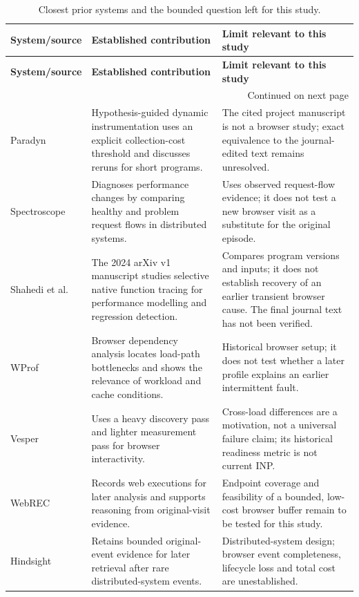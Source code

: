\begin{longtable}{@{}p{}p{}p{}@{}}
\caption{Closest prior systems and the bounded question left for this study.}\label{tab:closest-prior-work}\\
\toprule
\textbf{System/source} & \textbf{Established contribution} & \textbf{Limit relevant to this study} \\
\midrule
\endfirsthead
\toprule
\textbf{System/source} & \textbf{Established contribution} & \textbf{Limit relevant to this study} \\
\midrule
\endhead
\midrule
\multicolumn{3}{r}{\small Continued on next page}\\
\endfoot
\bottomrule
\endlastfoot
Paradyn \parencite{TIIDVPV8} & Hypothesis-guided dynamic instrumentation uses an explicit collection-cost threshold and discusses reruns for short programs. & The cited project manuscript is not a browser study; exact equivalence to the journal-edited text remains unresolved. \\
Spectroscope \parencite{Z2BQ69Z4} & Diagnoses performance changes by comparing healthy and problem request flows in distributed systems. & Uses observed request-flow evidence; it does not test a new browser visit as a substitute for the original episode. \\
Shahedi et al. \parencite{IX2DU87B} & The 2024 arXiv v1 manuscript studies selective native function tracing for performance modelling and regression detection. & Compares program versions and inputs; it does not establish recovery of an earlier transient browser cause. The final journal text has not been verified. \\
WProf \parencite{D568X6SQ} & Browser dependency analysis locates load-path bottlenecks and shows the relevance of workload and cache conditions. & Historical browser setup; it does not test whether a later profile explains an earlier intermittent fault. \\
Vesper \parencite{HS3PKWFL} & Uses a heavy discovery pass and lighter measurement pass for browser interactivity. & Cross-load differences are a motivation, not a universal failure claim; its historical readiness metric is not current INP. \\
WebREC \parencite{ZZSL9IPU} & Records web executions for later analysis and supports reasoning from original-visit evidence. & Endpoint coverage and feasibility of a bounded, low-cost browser buffer remain to be tested for this study. \\
Hindsight \parencite{3ED3FDXH} & Retains bounded original-event evidence for later retrieval after rare distributed-system events. & Distributed-system design; browser event completeness, lifecycle loss and total cost are unestablished. \\

\end{longtable}
